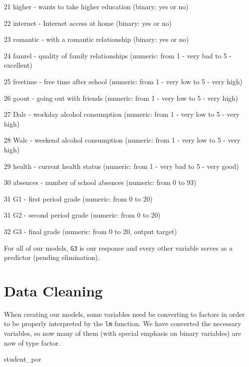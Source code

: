\documentclass[
]{article}
\newenvironment{Shaded}{\begin{snugshade}}{\end{snugshade}}
\newcommand{\NormalTok}[1]{#1}
\begin{document}
21 higher - wants to take higher education (binary: yes or no)

22 internet - Internet access at home (binary: yes or no)

23 romantic - with a romantic relationship (binary: yes or no)

24 famrel - quality of family relationships (numeric: from 1 - very bad
to 5 - excellent)

25 freetime - free time after school (numeric: from 1 - very low to 5 -
very high)

26 goout - going out with friends (numeric: from 1 - very low to 5 -
very high)

27 Dalc - workday alcohol consumption (numeric: from 1 - very low to 5 -
very high)

28 Walc - weekend alcohol consumption (numeric: from 1 - very low to 5 -
very high)

29 health - current health status (numeric: from 1 - very bad to 5 -
very good)

30 absences - number of school absences (numeric: from 0 to 93)

31 G1 - first period grade (numeric: from 0 to 20)

31 G2 - second period grade (numeric: from 0 to 20)

32 G3 - final grade (numeric: from 0 to 20, output target)

For all of our models, \texttt{G3} is our response and every other
variable serves as a predictor (pending elimination).

\hypertarget{data-cleaning}{%
\section{Data Cleaning}\label{data-cleaning}}

When creating our models, some variables need be converting to factors
in order to be properly interpreted by the \texttt{lm} function. We have
converted the necessary variables, so now many of them (with special
emphasis on binary variables) are now of type factor.

\begin{Shaded}
\begin{Highlighting}[]
\NormalTok{student\_por}
\end{Highlighting}
\end{Shaded}
\end{document}
